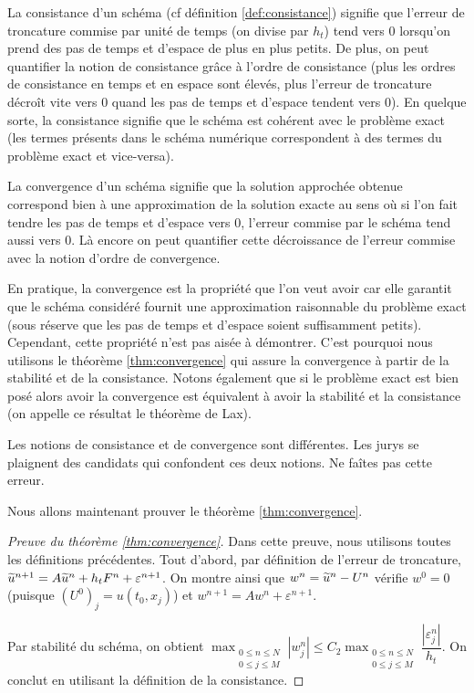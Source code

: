 \documentclass[12pt,a4paper,twoside]{article}
\begin{document}
La consistance d'un sch\'ema (cf d\'efinition \ref{def:consistance})
signifie que l'erreur de troncature commise par unit\'e de temps
(on divise par $h_t$) tend vers $0$ lorsqu'on prend 
des pas de temps et d'espace de plus en plus petits.
De plus, on peut quantifier la notion de consistance
gr\^ace \`a l'ordre de consistance 
(plus les ordres de consistance en temps et en espace sont \'elev\'es,
plus l'erreur de troncature d\'ecro\^it vite vers $0$ quand les pas 
de temps et d'espace tendent vers $0$).
En quelque sorte, la consistance signifie que le sch\'ema est
coh\'erent avec le probl\`eme exact 
(les termes pr\'esents dans le sch\'ema num\'erique correspondent
\`a des termes du probl\`eme exact et vice-versa).


La convergence d'un sch\'ema signifie que la solution approch\'ee obtenue
correspond bien \`a une approximation de la solution exacte
au sens o\`u si l'on fait tendre les pas de temps et d'espace vers
$0$, l'erreur commise par le sch\'ema tend aussi vers $0$.
L\`a encore on peut quantifier cette d\'ecroissance de l'erreur commise 
avec la notion d'ordre de convergence.


En pratique, la convergence est la propri\'et\'e que l'on veut avoir
car elle garantit que le sch\'ema consid\'er\'e fournit une approximation
raisonnable du probl\`eme exact (sous r\'eserve que les pas de temps
et d'espace soient suffisamment petits).
Cependant, cette propri\'et\'e n'est pas ais\'ee \`a d\'emontrer.
C'est pourquoi nous utilisons le th\'eor\`eme \ref{thm:convergence}
qui assure la convergence \`a partir de la stabilit\'e et 
de la consistance.
Notons \'egalement que si le probl\`eme exact est bien pos\'e
alors avoir la convergence est \'equivalent \`a avoir
la stabilit\'e et la consistance (on appelle ce r\'esultat le 
th\'eor\`eme de Lax). 


\begin{remark}
  Les notions de consistance et de convergence sont diff\'erentes.
  Les jurys se plaignent des candidats qui confondent ces deux
  notions.
  Ne fa\^ites pas cette erreur.
\end{remark}

Nous allons maintenant prouver le th\'eor\`eme \ref{thm:convergence}.
\begin{proof}[Preuve du th\'eor\`eme \ref{thm:convergence}]
  Dans cette preuve, nous utilisons toutes les d\'efinitions pr\'ec\'edentes.
  Tout d'abord, par d\'efinition de l'erreur de troncature,
  $\widetilde{u}^{n+1} = A \widetilde{u}^n + h_t F^n + \varepsilon^{n+1}$.
  On montre ainsi que
  $w^n = \widetilde{u}^{n} - U^{n}$ v\'erifie $w^0 = 0$ 
  (puisque $(U^0)_j = u(t_0,x_j)$) et
  $w^{n+1} = A w^n + \varepsilon^{n+1}$.

  Par stabilit\'e du sch\'ema, on obtient
  $\max_{\substack{0\leq n \leq N\\ 0 \leq j \leq M}} | w_j^n |
  \leq C_2 \max_{\substack{0\leq n \leq N\\ 0 \leq j \leq M}} \dfrac{| \varepsilon_j^n |}{h_t}$.
  On conclut en utilisant la d\'efinition de la consistance.
\end{proof}
\end{document}
